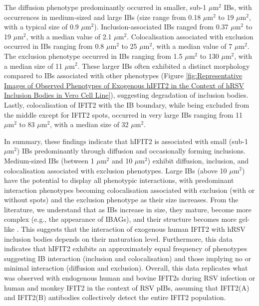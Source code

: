 The diffusion phenotype predominantly occurred in smaller, sub-1 $\mu \mbox{m}^2$ IBs, with occurrences in medium-sized and large IBs (size range from 0.18 $\mu \mbox{m}^2$ to 19 $\mu \mbox{m}^2$, with a typical size of 0.9 $\mu \mbox{m}^2$). Inclusion-associated IBs ranged from 0.37 $\mu \mbox{m}^2$ to 19 $\mu \mbox{m}^2$, with a median value of 2.1 $\mu \mbox{m}^2$. Colocalisation associated with exclusion occurred in IBs ranging from 0.8 $\mu \mbox{m}^2$ to 25 $\mu \mbox{m}^2$, with a median value of 7 $\mu \mbox{m}^2$. The exclusion phenotype occurred in IBs ranging from 1.5 $\mu \mbox{m}^2$ to 130 $\mu \mbox{m}^2$, with a median size of 11 $\mu \mbox{m}^2$. These larger IBs often exhibited a distinct morphology compared to IBs associated with other phenotypes (Figure \ref{fig:Representative Images of Observed Phenotypes of Exogenous hIFIT2 in the Context of hRSV Inclusion Bodies in Vero Cell Line}), suggesting degradation of inclusion bodies. Lastly, colocalisation of IFIT2 with the IB boundary, while being excluded from the middle except for IFIT2 spots, occurred in very large IBs ranging from 11 $\mu \mbox{m}^2$ to 83 $\mu \mbox{m}^2$, with a median size of 32 $\mu \mbox{m}^2$.

In summary, these findings indicate that hIFIT2 is associated with small (sub-1 $\mu \mbox{m}^2$) IBs predominantly through diffusion and occasionally forming inclusions. Medium-sized IBs (between 1 $\mu \mbox{m}^2$ and 10 $\mu \mbox{m}^2$) exhibit diffusion, inclusion, and colocalisation associated with exclusion phenotypes. Large IBs (above 10 $\mu \mbox{m}^2$) have the potential to display all phenotypic interactions, with predominant interaction phenotypes becoming colocalisation associated with exclusion (with or without spots) and the exclusion phenotype as their size increases. From the literature, we understand that as IBs increase in size, they mature, become more complex (e.g., the appearance of IBAGs), and their structure becomes more gel-like \cite{Weber1995NonstructuralSerum, Fricke2013P38Assembly, Rincheval2017FunctionalVirus, Jobe2021BovineResponses}. This suggests that the interaction of exogenous human IFIT2 with hRSV inclusion bodies depends on their maturation level. Furthermore, this data indicates that hIFIT2 exhibits an approximately equal frequency of phenotypes suggesting IB interaction (inclusion and colocalisation) and those implying no or minimal interaction (diffusion and exclusion). Overall, this data replicates what was observed with endogenous human and bovine IFIT2s during RSV infection or human and monkey IFIT2 in the context of RSV pIBs, assuming that IFIT2(A) and IFIT2(B) antibodies collectively detect the entire IFIT2 population.

